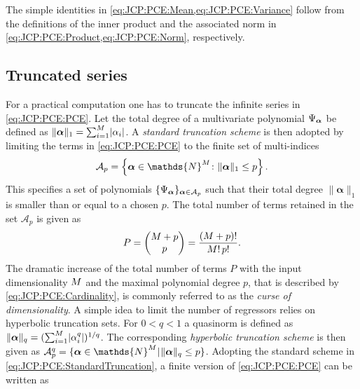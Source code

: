 The simple identities in \cref{eq:JCP:PCE:Mean,eq:JCP:PCE:Variance} follow from the definitions of the inner product and the associated norm in \cref{eq:JCP:PCE:Product,eq:JCP:PCE:Norm}, respectively.

\subsection{Truncated series}
For a practical computation one has to truncate the infinite series in \cref{eq:JCP:PCE:PCE}.
Let the total degree of a multivariate polynomial \(\Psi_{\bm{\alpha}}\) be defined as \(\lVert \bm{\alpha} \rVert_1 = \sum_{i=1}^M \lvert \alpha_i \rvert\).
A \emph{standard truncation scheme} is then adopted by limiting the terms in \cref{eq:JCP:PCE:PCE} to the finite set of multi-indices
\begin{equation} \label{eq:JCP:PCE:StandardTruncation}
  \mathcal{A}_p = \left\{ \bm{\alpha} \in \mathds{N}^\dimParam \colon \lVert \bm{\alpha} \rVert_1 \leq p \right\}.
\end{equation}
This specifies a set of polynomials \(\{\Psi_{\bm{\alpha}}\}_{\bm{\alpha} \in \mathcal{A}_p}\)
such that their total degree \(\lVert \bm{\alpha} \rVert_1\) is smaller than or equal to a chosen \(p\).
The total number of terms retained in the set \(\mathcal{A}_p\) is given as
\begin{equation} \label{eq:JCP:PCE:Cardinality}
  P = \begin{pmatrix}
        M + p \\
        p
      \end{pmatrix} = \frac{(M + p)!}{M! \, p!}.
\end{equation}
The dramatic increase of the total number of terms \(P\) with the input dimensionality \(M\) and the maximal polynomial degree \(p\),
that is described by \cref{eq:JCP:PCE:Cardinality}, is commonly referred to as the \emph{curse of dimensionality}.
A simple idea to limit the number of regressors relies on hyperbolic truncation sets.
For \(0 < q < 1\) a quasinorm is defined as \(\lVert \bm{\alpha} \rVert_q = (\sum_{i=1}^M \lvert \alpha_i^q \rvert)^{1/q}\).
The corresponding \emph{hyperbolic truncation scheme} is then given as \(\mathcal{A}_p^q = \{\bm{\alpha} \in \mathds{N}^\dimParam \cond \lVert \bm{\alpha} \rVert_q \leq p\}\).
Adopting the standard scheme in \cref{eq:JCP:PCE:StandardTruncation}, a finite version of \cref{eq:JCP:PCE:PCE} can be written as
